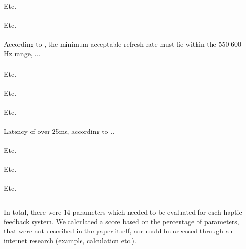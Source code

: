 \paragraph{}
Etc.

\paragraph{}
Etc.

\paragraph{}
According to \cite{Coles2011TheArt}, the minimum acceptable refresh rate must lie within the 550-600 Hz range, ...

\subsubsection{}
Etc.

\paragraph{}
Etc.

\paragraph{}
Etc.

\paragraph{}
Latency of over 25ms, according to ...

\paragraph{}
Etc.

\paragraph{}
Etc.

\paragraph{}
Etc.

\subsection{}

\subsection{}
In total, there were 14 parameters which needed to be evaluated for each haptic feedback system. We calculated a score based on the percentage of parameters, that were not described in the paper itself, nor could be accessed through an internet research (example, calculation etc.).